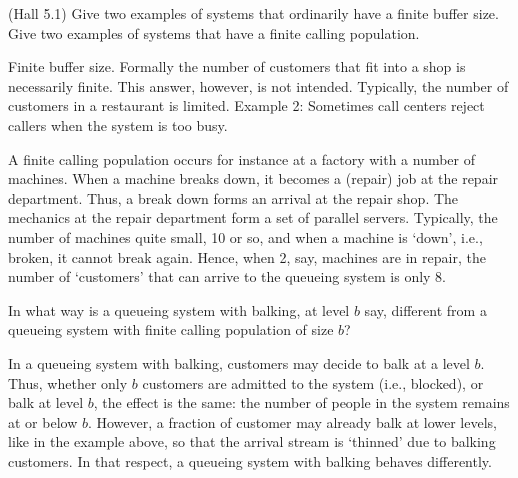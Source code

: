 \begin{question}(Hall 5.1) Give two examples of systems that
  ordinarily have a finite buffer size. Give two examples of systems
  that have a finite calling population.
  \begin{solution}
Finite buffer size. Formally the number of customers that fit into a
shop is necessarily finite. This answer, however, is not
intended. Typically, the number of customers in a restaurant is
limited. Example 2: Sometimes call centers reject callers when the system is too busy.

A finite calling population occurs for instance at a factory with a
number of machines. When a machine breaks down, it becomes a (repair)
job at the repair department.  Thus, a break down forms an arrival at
the repair shop.  The mechanics at the repair department form a set of
parallel servers. Typically, the number of machines quite small, 10 or
so, and when a machine is `down', i.e., broken, it cannot break again.
Hence, when 2, say, machines are in repair, the number of `customers'
that can arrive to the queueing system is only 8. 
  \end{solution}
\end{question}

\begin{question}
 In what way is a queueing system with balking, at level $b$
    say, different from a queueing system with finite calling
    population of size $b$? 
\begin{solution}
 In a queueing system with balking, customers may decide to
    balk at a level $b$. Thus, whether only $b$ customers are admitted
    to the system (i.e., blocked), or balk at level $b$, the effect is
    the same: the number of people in the system remains at or below
    $b$. However, a fraction of customer may already balk at lower
    levels, like in the example above, so that the arrival stream is
    `thinned' due to balking customers. In that respect, a queueing
    system with balking behaves differently.
\end{solution}
\end{question}




